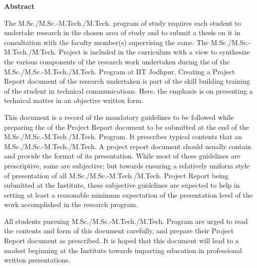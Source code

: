 \begin{flushright}
\huge{\textbf{Abstract}}
\end{flushright}




The M.Sc./M.Sc.-M.Tech./M.Tech.  program of study requires each student to undertake research in the chosen area of study and to submit a thesis on it in consultation with the faculty member(s) supervising the same. The M.Sc./M.Sc.-M.Tech./M.Tech. Project is included in the curriculum with a view to synthesize the various components of the research work undertaken during the of the M.Sc./M.Sc.-M.Tech./M.Tech. Program at IIT Jodhpur. Creating a Project Report document of the research undertaken is part of the skill building training of the student in technical communications. Here, the emphasis is on presenting a technical matter in an objective written form.

This document is a record of the mandatory guidelines to be followed while preparing the of the Project Report document to be submitted at the end of the M.Sc./M.Sc.-M.Tech./M.Tech. Program. It prescribes typical contents that an M.Sc./M.Sc.-M.Tech./M.Tech. A project report document should usually contain and provide the format of its presentation. While most of these guidelines are prescriptive, some are subjective; but towards ensuring a relatively uniform style of presentation of all M.Sc./M.Sc.-M.Tech./M.Tech. Project Report being submitted at the Institute, these subjective guidelines are expected to help in setting at least a reasonable minimum expectation of the presentation level of the work accomplished in the research program.

All students pursuing M.Sc./M.Sc.-M.Tech./M.Tech. Program are urged to read the contents and form of this document carefully, and prepare their Project Report document as prescribed. It is hoped that this document will lead to a modest beginning at the Institute towards imparting education in professional written presentations.

